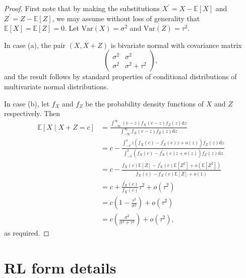 \documentclass{article}
\theoremstyle{plain}
\begin{document}
\begin{proof}
First note that by making the substitutions $X^\prime=X-\mathbb E\left[X\right]$ and $Z^\prime=Z-\mathbb E\left[Z\right]$, we may assume without loss of generality that $\mathbb E\left[X\right]=\mathbb E\left[Z\right]=0$. Let $\mathrm{Var}\left(X\right)=\sigma^2$ and $\mathrm{Var}\left(Z\right)=\tau^2$.

In case (a), the pair $\left(X,X+Z\right)$ is bivariate normal with covariance matrix
\[
\begin{pmatrix}
\sigma^2 & \sigma^2\\
\sigma^2 & \sigma^2+\tau^2
\end{pmatrix},
\]
and the result follows by standard properties of conditional distributions of multivariate normal distributions.

In case (b), let $f_X$ and $f_Z$ be the probability density functions of $X$ and $Z$ respectively. Then
\begin{equation*}
\begin{split}
\mathbb E\left[X\mid X+Z=c\right]&=\frac{\int_{-\infty}^{\infty}\left(c-z\right)f_X\left(c-z\right)f_Z\left(z\right)\mathrm dz}{\int_{-\infty}^{\infty}f_X\left(c-z\right)f_Z\left(z\right)\mathrm dz}\\
&=c-\frac{\int_{-\delta}^{\delta}z\left(f_X\left(c\right)-f^\prime_X\left(c\right)z+o\left(z\right)\right)f_Z\left(z\right)\mathrm dz}{\int_{-\delta}^{\delta}\left(f_X\left(c\right)-f^\prime_X\left(c\right)z+o\left(z\right)\right)f_Z\left(z\right)\mathrm dz}\\
&=c-\frac{f_X\left(c\right)\mathbb E\left[Z\right]-f^\prime_X\left(c\right)\mathbb E\left[Z^2\right]+o\left(\mathbb E\left[Z^2\right]\right)}{f_X\left(c\right)-f^\prime_X\left(c\right)\mathbb E\left[Z\right]+o\left(1\right)}\\
&=c+\frac{f^\prime_X\left(c\right)}{f_X\left(c\right)}\tau^2+o\left(\tau^2\right)\\
&=c\left(1-\frac{\tau^2}{\sigma^2}\right)+o\left(\tau^2\right)\\
&=c\left(\frac{\sigma^2}{\sigma^2+\tau^2}\right)+o\left(\tau^2\right),
\end{split}
\end{equation*}
as required.
\end{proof}

\newpage
\section{RL form details}\label{rl_form_appx}
\end{document}
